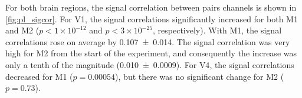 
For both brain regions, the signal correlation between pairs channels is shown in \autoref{fig:pl_sigcor}.
For \ac{V1}, the signal correlations significantly increased for both \ac{M1} and \ac{M2} ($p < 1 \times 10^{-12}$ and $p < 3 \times 10^{-25}$, respectively).
With \ac{M1}, the signal correlations rose on average by \num{0.107\pm0.014}.
The signal correlation was very high for \ac{M2} from the start of the experiment, and consequently the increase was only a tenth of the magnitude (\num{0.010\pm0.0009}).
For \ac{V4}, the signal correlations decreased for \ac{M1} ($p=0.00054$), but there was no significant change for \ac{M2} ($p=0.73$).

%
%
%

